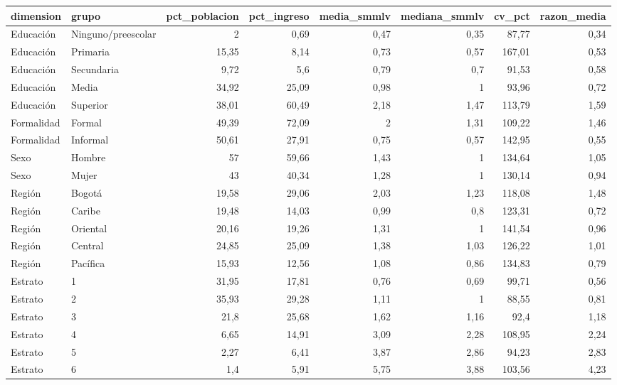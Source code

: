 \begin{tabular}{llrrrrrr}
\toprule
dimension & grupo & pct\_poblacion & pct\_ingreso & media\_smmlv & mediana\_smmlv & cv\_pct & razon\_media \\
\midrule
Educación & Ninguno/preescolar & 2 & 0,69 & 0,47 & 0,35 & 87,77 & 0,34 \\
Educación & Primaria & 15,35 & 8,14 & 0,73 & 0,57 & 167,01 & 0,53 \\
Educación & Secundaria & 9,72 & 5,6 & 0,79 & 0,7 & 91,53 & 0,58 \\
Educación & Media & 34,92 & 25,09 & 0,98 & 1 & 93,96 & 0,72 \\
Educación & Superior & 38,01 & 60,49 & 2,18 & 1,47 & 113,79 & 1,59 \\
Formalidad & Formal & 49,39 & 72,09 & 2 & 1,31 & 109,22 & 1,46 \\
Formalidad & Informal & 50,61 & 27,91 & 0,75 & 0,57 & 142,95 & 0,55 \\
Sexo & Hombre & 57 & 59,66 & 1,43 & 1 & 134,64 & 1,05 \\
Sexo & Mujer & 43 & 40,34 & 1,28 & 1 & 130,14 & 0,94 \\
Región & Bogotá & 19,58 & 29,06 & 2,03 & 1,23 & 118,08 & 1,48 \\
Región & Caribe & 19,48 & 14,03 & 0,99 & 0,8 & 123,31 & 0,72 \\
Región & Oriental & 20,16 & 19,26 & 1,31 & 1 & 141,54 & 0,96 \\
Región & Central & 24,85 & 25,09 & 1,38 & 1,03 & 126,22 & 1,01 \\
Región & Pacífica & 15,93 & 12,56 & 1,08 & 0,86 & 134,83 & 0,79 \\
Estrato & 1 & 31,95 & 17,81 & 0,76 & 0,69 & 99,71 & 0,56 \\
Estrato & 2 & 35,93 & 29,28 & 1,11 & 1 & 88,55 & 0,81 \\
Estrato & 3 & 21,8 & 25,68 & 1,62 & 1,16 & 92,4 & 1,18 \\
Estrato & 4 & 6,65 & 14,91 & 3,09 & 2,28 & 108,95 & 2,24 \\
Estrato & 5 & 2,27 & 6,41 & 3,87 & 2,86 & 94,23 & 2,83 \\
Estrato & 6 & 1,4 & 5,91 & 5,75 & 3,88 & 103,56 & 4,23 \\
\bottomrule
\end{tabular}
